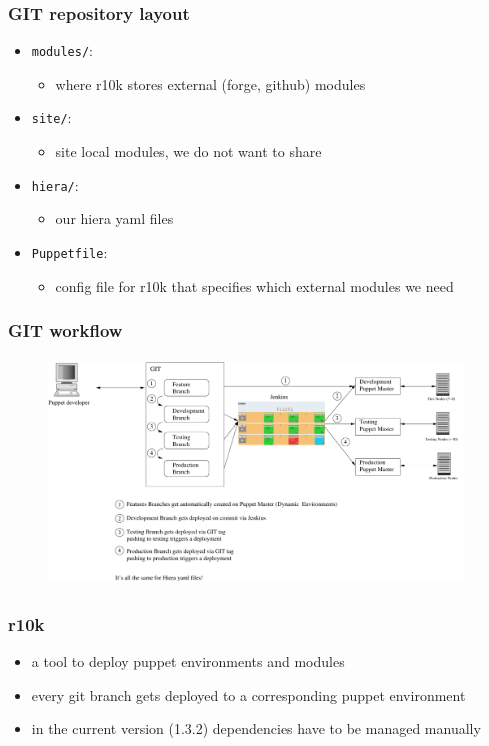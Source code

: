 \documentclass{beamer}
\begin{document}
\begin{frame}
  \frametitle{GIT repository layout}

  \begin{itemize}
  \item \texttt{modules/}:
    \begin{itemize}
    \item where r10k stores external (forge, github) modules
    \end{itemize}
  \item \texttt{site/}:
    \begin{itemize}
    \item site local modules, we do not want to share
    \end{itemize}
  \item \texttt{hiera/}:
    \begin{itemize}
    \item our hiera yaml files
    \end{itemize}
  \item \texttt{Puppetfile}:
    \begin{itemize}
    \item config file for r10k that specifies which external modules we need
    \end{itemize}
  \end{itemize}
\end{frame}


\begin{frame}
  \frametitle{GIT workflow}
  \begin{figure}
    \centering
      \includegraphics[height=6cm,width=11cm]{../pics/puppet_deployment2}
    \label{fig:stack}
  \end{figure}

\end{frame}

\begin{frame}
  \frametitle{r10k}

  \begin{itemize}
  \item a tool to deploy puppet environments and modules
  \item every git branch gets deployed to a corresponding puppet environment
  \item in the current version (1.3.2) dependencies have to be managed
    manually
  \end{itemize}
\end{frame}
\end{document}
